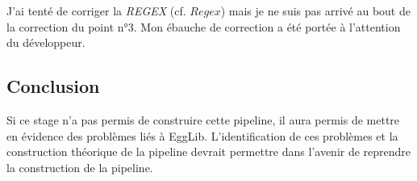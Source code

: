 \documentclass[../main]{subfiles} %
\begin{document}
J'ai tenté de corriger la \textit{REGEX} (cf. \cite{florent_f-marchalm1bioinfointernship2024-inrae_agap_ge2pop_2024} $Regex$) mais je ne suis pas arrivé au bout de la correction du point n°3. Mon ébauche de correction a été portée à l'attention du développeur. 

\subsection{Conclusion}
\label{sec:EggConclusion}
Si ce stage n'a pas permis de construire cette pipeline, il aura permis de mettre en évidence des problèmes liés à \gls{EggLib}. L'identification de ces problèmes et la construction théorique de la pipeline devrait permettre dans l'avenir de reprendre la construction de la pipeline.
\end{document}
